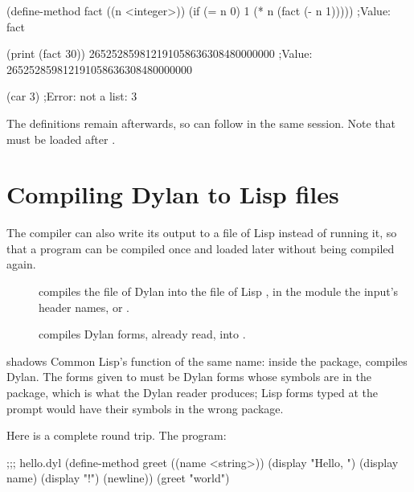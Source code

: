 \begin{repl}
(define-method fact ((n <integer>))
 (if (= n 0)
     1
     (* n (fact (- n 1)))))
;Value: fact

(print (fact 30))
265252859812191058636308480000000
;Value: 265252859812191058636308480000000

(car 3)
;Error: not a list: 3
\end{repl}

\noindent
The definitions remain afterwards, so  can follow in
the same session. Note that  must be loaded after
.

\section{Compiling Dylan to Lisp files}\label{sec:lisp-compile-file}

The compiler can also write its output to a file of Lisp instead of
running it, so that a program can be compiled once and loaded later
without being compiled again.

\begin{description}
\item[] compiles
  the file of Dylan  into the file of Lisp , in
  the module the input's  header names, or
  .
\item[]
  compiles Dylan forms, already read, into .
\end{description}

\noindent
{} shadows Common Lisp's function of the same
name: inside the  package,  compiles
Dylan. The forms given to  must be Dylan
forms whose symbols are in the  package, which is what the
Dylan reader  produces; Lisp forms typed at the
\code{*} prompt would have their symbols in the wrong package.

Here is a complete round trip. The program:

\begin{dylan}
;;; hello.dyl
(define-method greet ((name <string>))
  (display "Hello, ")
  (display name)
  (display "!")
  (newline))
(greet "world")
\end{dylan}

